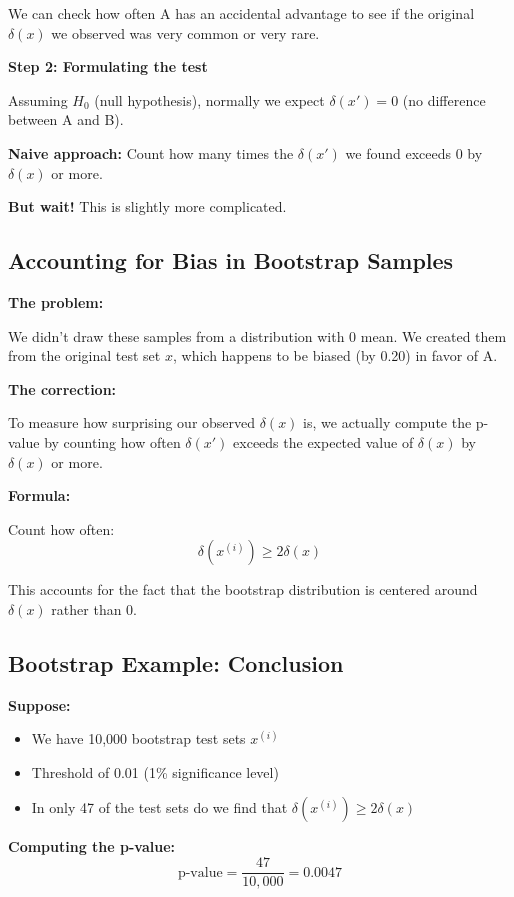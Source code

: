 \documentclass[11pt,a4paper]{article}
\theoremstyle{definition}
\theoremstyle{plain}
\theoremstyle{remark}
\begin{document}
We can check how often A has an accidental advantage to see if the original $\delta(x)$ we observed was very common or very rare.

\textbf{Step 2: Formulating the test}

Assuming $H_0$ (null hypothesis), normally we expect $\delta(x') = 0$ (no difference between A and B).

\textbf{Naive approach:} Count how many times the $\delta(x')$ we found exceeds 0 by $\delta(x)$ or more.

\textbf{But wait!} This is slightly more complicated.

\subsection{Accounting for Bias in Bootstrap Samples}

\textbf{The problem:}

We didn't draw these samples from a distribution with 0 mean. We created them from the original test set $x$, which happens to be biased (by 0.20) in favor of A.

\textbf{The correction:}

To measure how surprising our observed $\delta(x)$ is, we actually compute the p-value by counting how often $\delta(x')$ exceeds the expected value of $\delta(x)$ by $\delta(x)$ or more.

\textbf{Formula:}

Count how often:
\[
\delta(x^{(i)}) \geq 2\delta(x)
\]

This accounts for the fact that the bootstrap distribution is centered around $\delta(x)$ rather than 0.

\subsection{Bootstrap Example: Conclusion}

\textbf{Suppose:}
\begin{itemize}
    \item We have 10,000 bootstrap test sets $x^{(i)}$
    \item Threshold of 0.01 (1\% significance level)
    \item In only 47 of the test sets do we find that $\delta(x^{(i)}) \geq 2\delta(x)$
\end{itemize}

\textbf{Computing the p-value:}
\[
\text{p-value} = \frac{47}{10{,}000} = 0.0047
\]
\end{document}
